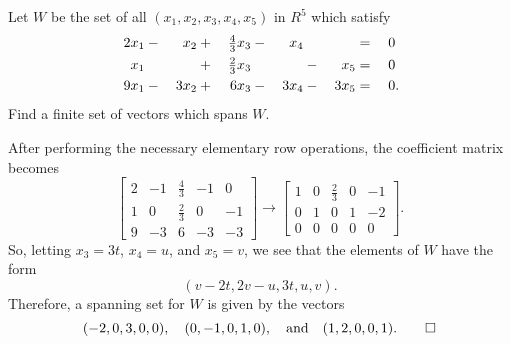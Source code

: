  Let $W$ be the set of all $(x_1,x_2,x_3,x_4,x_5)$ in $R^5$
which satisfy
\begin{alignat*}{6}
  2x_1 &{}-{}& x_2 &{}+{}& \tfrac43x_3 &{}-{}& x_4 && &{}={}& 0 \\
  x_1 && &{}+{}& \tfrac23x_3 && &{}-{}& x_5 &{}={}& 0 \\
  9x_1 &{}-{}& 3x_2 &{}+{}& 6x_3 &{}-{}& 3x_4 &{}-{}& 3x_5 &{}={}& 0\rlap.
\end{alignat*}
Find a finite set of vectors which spans $W$.
\begin{solution}
  After performing the necessary elementary row operations, the
  coefficient matrix becomes
  \begin{equation*}
    \begin{bmatrix}
      2 & -1 & \frac43 & -1 & 0 \\[3pt]
      1 & 0 & \frac23 & 0 & -1 \\[3pt]
      9 & -3 & 6 & -3 & -3
    \end{bmatrix}
    \rightarrow
    \begin{bmatrix}
      1 & 0 & \frac23 & 0 & -1 \\[3pt]
      0 & 1 & 0 & 1 & -2 \\[3pt]
      0 & 0 & 0 & 0 & 0
    \end{bmatrix}.
  \end{equation*}
  So, letting $x_3 = 3t$, $x_4 = u$, and $x_5 = v$, we see that the
  elements of $W$ have the form
  \begin{equation*}
    (v-2t, 2v-u, 3t, u, v).
  \end{equation*}
  Therefore, a spanning set for $W$ is given by the vectors
  \begin{equation*}
    (-2,0,3,0,0), \quad (0,-1,0,1,0), \quad
    \text{and}\quad
    (1,2,0,0,1). \qedhere
  \end{equation*}
\end{solution}
